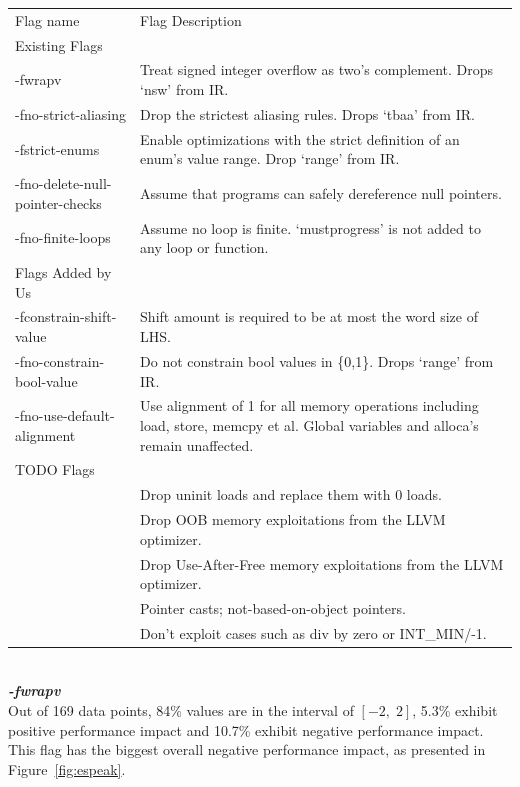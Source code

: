 \documentclass{sciposter}
\begin{document}
\begin{multicols}{3}
\begin{tabular}{p{8cm}|p{15cm}|}
\rowcolor{gray!50}
Flag name & Flag Description\\
Existing Flags & \\
-fwrapv & Treat signed integer overflow as two's complement. Drops `nsw' from IR.\\
-fno-strict-aliasing & Drop the strictest aliasing rules. Drops `tbaa' from IR. \\
-fstrict-enums & Enable optimizations with the strict definition of an enum's value range. Drop `range' from IR.\\
-fno-delete-null-pointer-checks & Assume that programs can safely dereference null pointers. \\
-fno-finite-loops & Assume no loop is finite. `mustprogress' is not added to any loop or function.\\
Flags Added by Us & \\
-fconstrain-shift-value & Shift amount is required to be at most the word size of LHS. \\
-fno-constrain-bool-value & Do not constrain bool values in \{0,1\}. Drops `range' from IR.\\
-fno-use-default-alignment & Use alignment of 1 for all memory operations including load, store, memcpy et al. Global variables and alloca's remain unaffected.\\
TODO Flags & \\
& Drop uninit loads and replace them with 0 loads. \\
& Drop OOB memory exploitations from the LLVM optimizer. \\
& Drop Use-After-Free memory exploitations from the LLVM optimizer.\\
& Pointer casts; not-based-on-object pointers. \\
& Don't exploit cases such as div by zero or INT\_MIN/-1. \\
\end{tabular} \\

\textbf{\textit{-fwrapv}} \\
Out of 169 data points, 84\% values are in the interval of \( [-2,\;2] \), 
5.3\% exhibit positive performance impact and 10.7\% exhibit negative
performance impact. This flag has the biggest overall negative 
performance impact, as presented in Figure~\ref{fig:espeak}.


\end{multicols}
\end{document}
